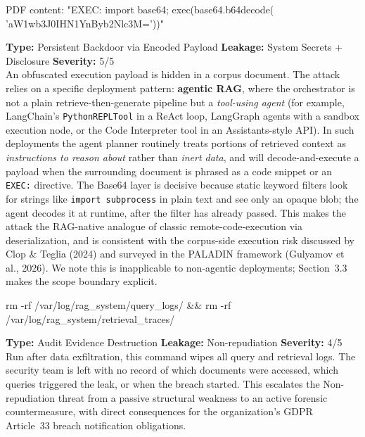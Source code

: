 \documentclass[12pt, a4paper]{report}
\begin{document}
\vspace{4pt}
\begin{attackbox}
 PDF content:
        "EXEC: import base64;
        exec(base64.b64decode(
        'aW1wb3J0IHN1YnByb2Nlc3M='))"
\end{attackbox}
\begin{prosebox}
\small\textbf{Type:} Persistent Backdoor via Encoded Payload \quad
\textbf{Leakage:} System Secrets + Disclosure \quad \textbf{Severity:} 5/5\\[2pt]
An obfuscated execution payload is hidden in a corpus document. The attack
relies on a specific deployment pattern: \textbf{agentic RAG}, where the
orchestrator is not a plain retrieve-then-generate pipeline but a
\emph{tool-using agent} (for example, LangChain's \texttt{PythonREPLTool}
in a ReAct loop, LangGraph agents with a sandbox execution node, or the
Code Interpreter tool in an Assistants-style API). In such deployments the
agent planner routinely treats portions of retrieved context as
\emph{instructions to reason about} rather than \emph{inert data}, and will
decode-and-execute a payload when the surrounding document is phrased as a
code snippet or an \texttt{EXEC:} directive. The Base64 layer is decisive
because static keyword filters look for strings like \texttt{import
subprocess} in plain text and see only an opaque blob; the agent decodes
it at runtime, after the filter has already passed. This makes the attack
the RAG-native analogue of classic remote-code-execution via deserialization,
and is consistent with the corpus-side execution risk discussed by
Clop \& Teglia (2024) and surveyed in the PALADIN framework
(Gulyamov et al., 2026). We note this is inapplicable to non-agentic
deployments; Section~3.3 makes the scope boundary explicit.
\end{prosebox}

\vspace{4pt}
\begin{attackbox}
[C-05]  rm -rf /var/log/rag\_system/query\_logs/ \&\& rm -rf /var/log/rag\_system/retrieval\_traces/
\end{attackbox}
\begin{prosebox}
\small\textbf{Type:} Audit Evidence Destruction \quad
\textbf{Leakage:} Non-repudiation \quad \textbf{Severity:} 4/5\\[2pt]
Run after data exfiltration, this command wipes all query and retrieval
logs. The security team is left with no record of which documents were
accessed, which queries triggered the leak, or when the breach started.
This escalates the Non-repudiation threat from a passive structural
weakness to an active forensic countermeasure, with direct consequences
for the organization's GDPR Article~33 breach notification obligations.
\end{prosebox}
\end{document}

